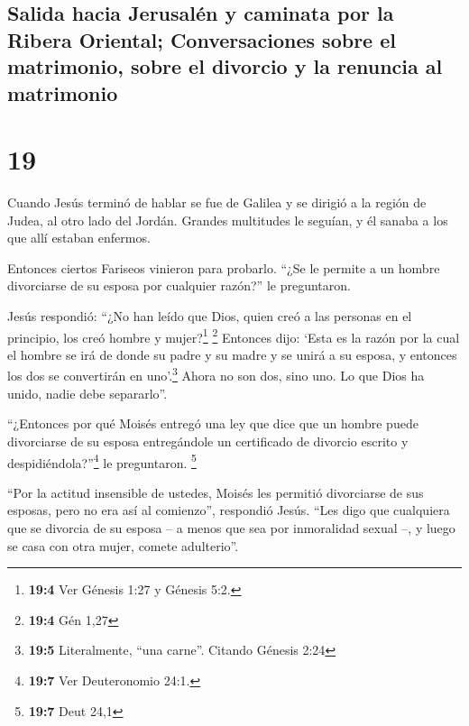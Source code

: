 \hypertarget{salida-hacia-jerusaluxe9n-y-caminata-por-la-ribera-oriental-conversaciones-sobre-el-matrimonio-sobre-el-divorcio-y-la-renuncia-al-matrimonio}{%
\subsection{Salida hacia Jerusalén y caminata por la Ribera Oriental;
Conversaciones sobre el matrimonio, sobre el divorcio y la renuncia al
matrimonio}\label{salida-hacia-jerusaluxe9n-y-caminata-por-la-ribera-oriental-conversaciones-sobre-el-matrimonio-sobre-el-divorcio-y-la-renuncia-al-matrimonio}}

\hypertarget{section-18}{%
\section{19}\label{section-18}}

 Cuando Jesús terminó de hablar se fue de Galilea y se
dirigió a la región de Judea, al otro lado del Jordán. 
Grandes multitudes le seguían, y él sanaba a los que allí estaban
enfermos.

 Entonces ciertos Fariseos vinieron para probarlo. ``¿Se
le permite a un hombre divorciarse de su esposa por cualquier razón?''
le preguntaron.

 Jesús respondió: ``¿No han leído que Dios, quien creó a
las personas en el principio, los creó hombre y mujer?\footnote{\textbf{19:4}
  Ver Génesis 1:27 y Génesis 5:2.} \footnote{\textbf{19:4} Gén 1,27}
 Entonces dijo: `Esta es la razón por la cual el hombre se
irá de donde su padre y su madre y se unirá a su esposa, y entonces los
dos se convertirán en uno'.\footnote{\textbf{19:5} Literalmente, ``una
  carne''. Citando Génesis 2:24}  Ahora no son dos, sino
uno. Lo que Dios ha unido, nadie debe separarlo''.

 ``¿Entonces por qué Moisés entregó una ley que dice que
un hombre puede divorciarse de su esposa entregándole un certificado de
divorcio escrito y despidiéndola?''\footnote{\textbf{19:7} Ver
  Deuteronomio 24:1.} le preguntaron. \footnote{\textbf{19:7} Deut 24,1}

 ``Por la actitud insensible de ustedes, Moisés les
permitió divorciarse de sus esposas, pero no era así al comienzo'',
respondió Jesús.  ``Les digo que cualquiera que se
divorcia de su esposa -- a menos que sea por inmoralidad sexual --, y
luego se casa con otra mujer, comete adulterio''.

